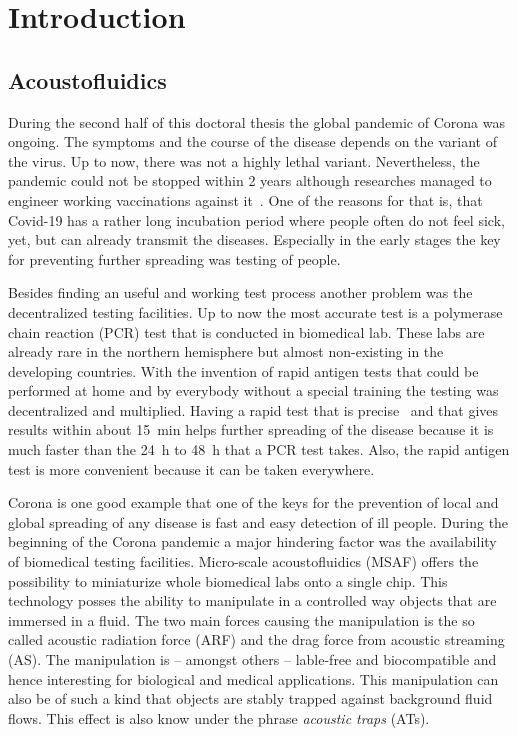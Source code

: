 \chapter{Introduction\label{ch:intro}}
\section{Acoustofluidics}

During the second half of this doctoral thesis the global pandemic of Corona 
was ongoing. The symptoms and the course of the disease depends on the variant 
of the virus. Up to now, there was not a highly lethal variant. Nevertheless, 
the pandemic could not be stopped within 2 years although researches managed to 
engineer working vaccinations against 
it~\cite{Polack2020,Mahase2020,Voysey2021}. One of the reasons for that is, 
that Covid-19 has a rather long incubation period where people often do not 
feel sick, yet, but can already transmit the diseases. Especially in the early 
stages the key for preventing further spreading was testing of people.

Besides finding an useful and working test process another problem was the 
decentralized testing facilities. Up to now the most accurate test is a 
polymerase chain reaction (PCR) test that is conducted in biomedical lab. These 
labs are already rare in the northern hemisphere but almost non-existing in the 
developing countries. With the invention of rapid antigen tests that could be 
performed at home and by everybody without a special training the testing was 
decentralized and multiplied. Having a rapid test that is 
precise~\cite{Albert2021} and that gives results within about \SI{15}{\minute} 
helps further spreading of the disease because it is much faster than the 
\SI{24}{\hour} to \SI{48}{\hour} that a PCR test takes. Also, the rapid antigen 
test is more convenient because it can be taken everywhere.

Corona is one good example that one of the keys for the prevention of local and 
global spreading of any disease is fast and easy detection of ill people. 
During the beginning of the Corona pandemic a major hindering factor was the 
availability of biomedical testing facilities. Micro-scale acoustofluidics 
(MSAF) offers the possibility to miniaturize whole biomedical labs onto a 
single chip. This technology posses the ability to manipulate in a controlled 
way objects that are immersed in a fluid. The two main forces causing the 
manipulation is the so called acoustic radiation force (ARF) and the drag force 
from acoustic streaming (AS). The manipulation is -- amongst others -- 
lable-free and biocompatible and hence interesting for biological and medical 
applications. This manipulation can also be of such a kind that objects are 
stably trapped against background fluid flows. This effect is also know under 
the phrase \emph{acoustic traps} (ATs).

